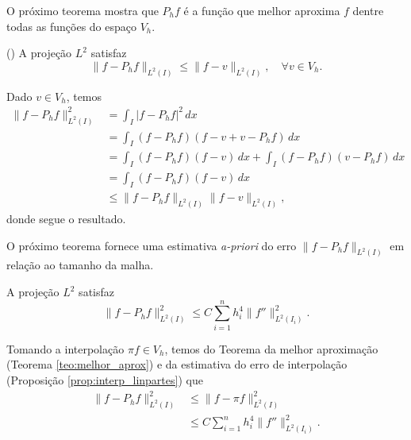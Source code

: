 O próximo teorema mostra que $P_h f$ é a função que melhor aproxima $f$ dentre todas as funções do espaço $V_h$.

\begin{teo}()\label{teo:melhor_aprox}
  A projeção $L^2$ satisfaz
  \begin{equation}
    \|f-P_hf\|_{L^2(I)} \leq \|f - v\|_{L^2(I)},\quad\forall v\in V_h.
  \end{equation}
\end{teo}
\begin{dem}
  Dado $v\in V_h$, temos
  \begin{align}
    \|f-P_hf\|_{L^2(I)}^2 &= \int_I |f-P_hf|^2\,dx\\
    &= \int_I (f-P_hf)(f-v+v-P_hf)\,dx\\
    &= \int_I(f-P_hf)(f-v)\,dx + \int_I(f-P_hf)(v-P_hf)\,dx\\
    &= \int_I (f-P_hf)(f-v)\,dx\\
    &\leq \|f-P_hf\|_{L^2(I)}\|f-v\|_{L^2(I)},
  \end{align}
donde segue o resultado.
\end{dem}

O próximo teorema fornece uma estimativa \textit{a-priori} do erro $\|f-P_h f\|_{L^2(I)}$ em relação ao tamanho da malha.

\begin{teo}\label{teo:erro_proj_1d}
  A projeção $L^2$ satisfaz
  \begin{equation}
    \|f-P_hf\|_{L^2(I)}^2 \leq C\sum_{i=1}^n h_i^4\|f''\|_{L^2(I_i)}^2.
  \end{equation}
\end{teo}
\begin{dem}
  Tomando a interpolação $\pi f \in V_h$, temos do Teorema da melhor aproximação (Teorema \ref{teo:melhor_aprox}) e da estimativa do erro de interpolação (Proposição \ref{prop:interp_linpartes}) que
  \begin{align}
    \|f - P_hf\|_{L^2(I)}^2 &\leq \|f-\pi f\|_{L^2(I)}^2\\
    &\leq C\sum_{i=1}^n h_i^4\|f''\|_{L^2(I_i)}^2.
  \end{align}
\end{dem}


